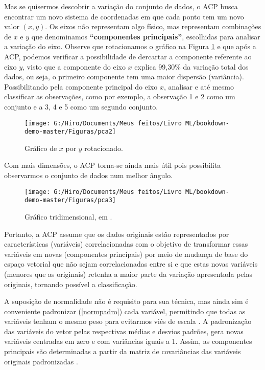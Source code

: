 \documentclass[
  openany]{book}
\begin{document}
Mas se quisermos descobrir a variação do conjunto de dados, o ACP busca encontrar um novo sistema de coordenadas em que cada ponto tem um novo valor \((x, y)\). Os eixos não representam algo físico, mas representam combinações de \(x\) e \(y\) que denominamos \textbf{``componentes principais''}, escolhidas para analisar a variação do eixo. Observe que rotacionamos o gráfico na Figura \ref{fig:pca2} e que após a ACP, podemos verificar a possibilidade de dercartar a componente referente ao eixo \(y\), visto que a componente do eixo \(x\) explica 99,30\% da variação total dos dados, ou seja, o primeiro componente tem uma maior dispersão (variância). Possibilitando pela componente principal do eixo \(x\), analisar e até mesmo classificar as observações, como por exemplo, a observação 1 e 2 como um conjunto e a 3, 4 e 5 como um segundo conjunto.

\begin{figure}

{\centering \texttt{[image: G:/Hiro/Documents/Meus feitos/Livro ML/bookdown-demo-master/Figuras/pca2]} 

}

\caption{Gráfico de \(x\) por \(y\) rotacionado.}\label{fig:pca2}
\end{figure}



Com mais dimensões, o ACP torna-se ainda mais útil pois possibilita observarmos o conjunto de dados num melhor ângulo.

\begin{figure}

{\centering \texttt{[image: G:/Hiro/Documents/Meus feitos/Livro ML/bookdown-demo-master/Figuras/pca3]} 

}

\caption{Gráfico tridimensional, em \citet{powellpca}.}\label{fig:pca3}
\end{figure}



Portanto, a ACP assume que os dados originais estão representados por características (variáveis) correlacionadas com o objetivo de transformar essas variáveis em novas (componentes principais) por meio de mudança de base do espaço vetorial que não sejam correlacionadas entre si e que estas novas variáveis (menores que as originais) retenha a maior parte da variação apresentada pelas originais, tornando possível a classificação.

A suposição de normalidade não é requisito para sua técnica, mas ainda sim é conveniente padronizar (\ref{normpadro}) cada variável, permitindo que todas as variáveis tenham o mesmo peso para evitarmos viés de escala \citep{hongyu2016analise}. A padronização das variáveis do vetor pelas respectivas médias e desvios padrões, gera novas variáveis centradas em zero e com variâncias iguais a 1. Assim, as componentes principais são determinadas a partir da matriz de covariâncias das variáveis originais padronizadas \citep{mingoti2007analise}.
\end{document}
